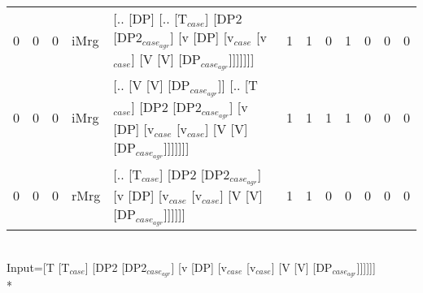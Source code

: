 \begin{tabularx}{\linewidth}{rrrlXrrrrrrr}
   0 &       0 &   0 & iMrg & [.. [DP] [.. [T$_{case}$] [DP2 [DP2$_{case_{agr}}$] [v [DP] [v$_{case}$ [v$_{case}$] [V [V] [DP$_{case_{agr}}$]]]]]]]                                                                  &             1 &             1 &                  0 &            1 &              0 &            0 &              0 \\
   0 &       0 &   0 & iMrg & [.. [V [V] [DP$_{case_{agr}}$]] [.. [T$_{case}$] [DP2 [DP2$_{case_{agr}}$] [v [DP] [v$_{case}$ [v$_{case}$] [V [V] [DP$_{case_{agr}}$]]]]]]]                                                 &             1 &             1 &                  1 &            1 &              0 &            0 &              0 \\
   0 &       0 &   0 & rMrg & [.. [T$_{case}$] [DP2 [DP2$_{case_{agr}}$] [v [DP] [v$_{case}$ [v$_{case}$] [V [V] [DP$_{case_{agr}}$]]]]]]                                                                            &             1 &             1 &                  0 &            0 &              0 &            0 &              0 \\
\hline
\end{tabularx}\endgroup\\
\begingroup\scriptsize Input=[T [T$_{case}$] [DP2 [DP2$_{case_{agr}}$] [v [DP] [v$_{case}$ [v$_{case}$] [V [V] [DP$_{case_{agr}}$]]]]]]\\*
